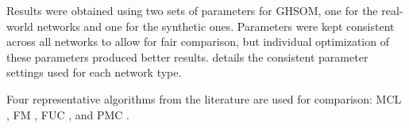 \documentclass{article}
\begin{document}
Results were obtained using two sets of parameters for GHSOM, one for the real-world networks and one for the synthetic ones. Parameters were kept consistent across all networks to allow for fair comparison, but individual optimization of these parameters produced better results.  details the consistent parameter settings used for each network type.

Four representative algorithms from the literature are used for comparison: MCL \cite{van2001graph}, FM \cite{clauset2004finding}, FUC \cite{blondel2008fast}, and PMC \cite{yang2013hierarchical}.



%
\end{document}
